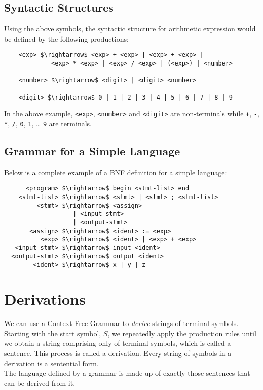 \subsection{Syntactic Structures}
Using the above symbols, the syntactic structure for arithmetic expression would be defined by the following productions:
\begin{lstlisting}
    <exp> $\rightarrow$ <exp> + <exp> | <exp> + <exp> | 
             <exp> * <exp> | <exp> / <exp> | (<exp>) | <number>
    
    <number> $\rightarrow$ <digit> | <digit> <number>

    <digit> $\rightarrow$ 0 | 1 | 2 | 3 | 4 | 5 | 6 | 7 | 8 | 9 
\end{lstlisting}
    
In the above example, \verb|<exp>|, \verb|<number>| and \verb|<digit>| are non-terminals while \verb|+|, \verb|-|, \verb|*|, \verb|/|, \verb|0|, \verb|1|, \ldots{} \verb|9| are terminals. 

\subsection{Grammar for a Simple Language}
Below is a complete example of a BNF definition for a simple language:
\begin{lstlisting}
      <program> $\rightarrow$ begin <stmt-list> end
    <stmt-list> $\rightarrow$ <stmt> | <stmt> ; <stmt-list>
         <stmt> $\rightarrow$ <assign>
                   | <input-stmt>
                   | <output-stmt>
       <assign> $\rightarrow$ <ident> := <exp>
          <exp> $\rightarrow$ <ident> | <exp> + <exp>
   <input-stmt> $\rightarrow$ input <ident>
  <output-stmt> $\rightarrow$ output <ident>
        <ident> $\rightarrow$ x | y | z
\end{lstlisting}

\section{Derivations}
We can use a Context-Free Grammar to \textit{derive} strings of terminal symbols. Starting with the start symbol, $S$, we repeatedly apply the production rules until we obtain a string comprising only of terminal symbols, which is called a sentence. This process is called a derivation. Every string of symbols in a derivation is a sentential form. \\

The language defined by a grammar is made up of exactly those sentences that can be derived from it.
